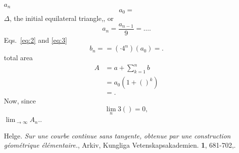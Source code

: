 \documentclass[12pt,a4paper]{article}
\begin{document}
    
  $a_n$
  \begin{displaymath}
    a_0=
  \end{displaymath}
  $\Delta$, the initial equilateral triangle,, or 
  \begin{equation}
    \label{eq:3}
    a_n = \frac{a_{n-1}}{9} = \ldots .
  \end{equation}
  Eqs.~\ref{eq:2} and \ref{eq:3}
  \begin{equation*}
    b_n = = \left( \cdot 4^n \right) \left( a_0 \right)  =. 
  \end{equation*}
  total area
  \begin{align*}
    A &= a + \sum_{k=1}^n b \\
      &= a_0\left(1 + \left( \right)^k \right) \\
      &= .
   \end{align*}
  Now, since
  \begin{displaymath}
    \lim_{n} 3\left( \right) = 0,
  \end{displaymath}
  $\lim_{\to \infty} A_n$..  



\begin{thebibliography}{99}
   Helge. \emph{Sur une courbe continue sans
      tangente, obtenue par une construction géométrique
      élémentaire.}, Arkiv,
    Kungliga Vetenskapsakademien. \textbf{1}, 681-702,.
\end{thebibliography}
\end{document}
